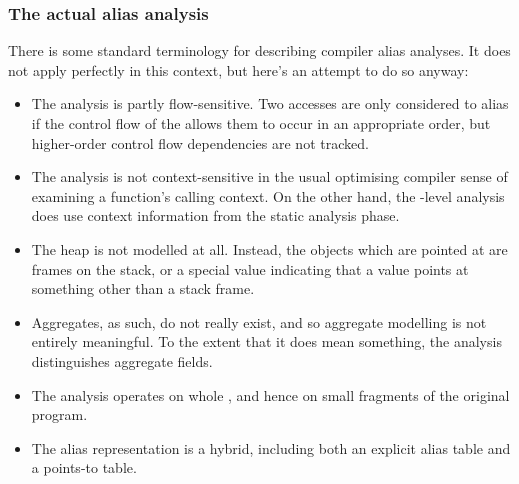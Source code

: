 


\subsubsection{The actual alias analysis}





There is some standard terminology for describing compiler alias
analyses.  It does not apply perfectly in
this context, but here's an attempt to do so anyway:

\begin{itemize}
\item
  The analysis is partly flow-sensitive.  Two accesses are only
  considered to alias if the control flow of the {\StateMachine}
  allows them to occur in an appropriate order, but higher-order
  control flow dependencies are not tracked.
\item
  The analysis is not context-sensitive in the usual optimising
  compiler sense of examining a function's calling context.  On the
  other hand, the {\StateMachine}-level analysis does use context
  information from the static analysis phase.
\item
  The heap is not modelled at all.  Instead, the objects which are
  pointed at are frames on the stack, or a special value indicating
  that a value points at something other than a stack frame.
\item
  Aggregates, as such, do not really exist, and so aggregate modelling
  is not entirely meaningful.  To the extent that it does mean
  something, the analysis distinguishes aggregate fields.
\item
  The analysis operates on whole {\StateMachines}, and hence on small
  fragments of the original program.
\item
  The alias representation is a hybrid, including both an explicit
  alias table and a points-to table. 
\end{itemize}

